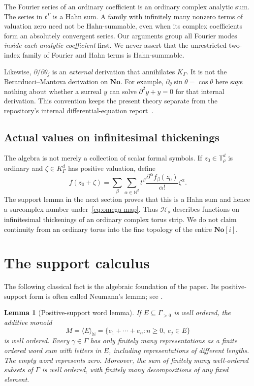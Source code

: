 \documentclass[11pt,letterpaper]{article}
\newtheorem{lemma}[theorem]{Lemma}
\theoremstyle{definition}
\theoremstyle{remark}
\newcommand{\No}{\mathbf{No}}
\newcommand{\N}{\mathbb N}
\newcommand{\T}{\mathbb T}
\newcommand{\HH}{\mathcal H}
\newcommand{\mon}[1]{\langle #1\rangle_{\N}}
\numberwithin{equation}{section}
\begin{document}
The Fourier series of an ordinary coefficient is an ordinary complex
analytic sum.  The series in $t^\Gamma$ is a Hahn sum.  A family with
infinitely many nonzero terms of valuation zero need not be Hahn-summable,
even when its complex coefficients form an absolutely convergent series.
Our arguments group all Fourier modes \emph{inside each analytic coefficient}
first.  We never assert that the unrestricted two-index family of Fourier
and Hahn terms is Hahn-summable.

Likewise, $\partial/\partial\theta_j$ is an \emph{external} derivation that
annihilates $K_\Gamma$.  It is not the Berarducci--Mantova derivation on $\No$.
For example, $\partial_\theta\sin\theta=\cos\theta$ here says nothing about
whether a surreal $y$ can solve $\partial^2y+y=0$ for that internal derivation.
This convention keeps the present theory separate from the repository's
internal differential-equation report~\cite{repo}.

\subsection{Actual values on infinitesimal thickenings}

The algebra is not merely a collection of scalar formal symbols.  If
$z_0\in\T^d_\rho$ is ordinary and $\zeta\in K_\Gamma^d$ has positive
valuation, define
\begin{equation}\label{eq:monad-eval}
 f(z_0+\zeta)=
 \sum_{\beta}\sum_{\alpha\in\N^d}
 t^\beta\frac{\partial^\alpha f_\beta(z_0)}{\alpha!}\zeta^\alpha.
\end{equation}
The support lemma in the next section proves that this is a Hahn sum and
hence a surcomplex number under~\eqref{eq:omega-map}.
Thus $\HH_\rho$ describes functions on infinitesimal thickenings of an
ordinary complex torus strip.  We do not claim continuity from an ordinary
torus into the fine topology of the entire $\No[i]$.

\section{The support calculus}
\label{sec:support}

The following classical fact is the algebraic foundation of the paper.
Its positive-support form is often called Neumann's lemma; see
\cite{neumann,poonen}.

\begin{lemma}[Positive-support word lemma]\label{lem:neumann}
If $E\subseteq\Gamma_{>0}$ is well ordered, the additive monoid
\[
 M=\mon E=\{e_1+\cdots+e_n:n\ge0,\ e_j\in E\}
\]
is well ordered.  Every $\gamma\in\Gamma$ has only finitely many
representations as a finite ordered word sum with letters in $E$, including
representations of different lengths.  The empty word represents zero.
Moreover, the sum of finitely many well-ordered subsets of $\Gamma$ is well
ordered, with finitely many decompositions of any fixed element.
\end{lemma}
\end{document}
